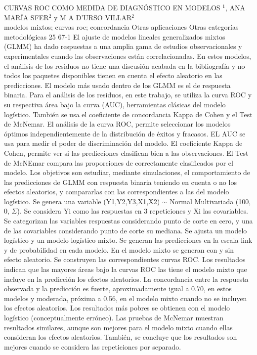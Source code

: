 \A
{CURVAS ROC COMO MEDIDA DE DIAGNÓSTICO EN MODELOS}
{$^1$, ANA MARÍA SFER$^2$ y M A D'URSO VILLAR$^2$}
{
\\}
{modelos mixtos; curvas roc; concordancia} 
 {Otras aplicaciones} 
 {Otras categorías metodológicas} 
 {25} 
 {67-1}
{El ajuste de modelos lineales generalizados mixtos (GLMM) ha dado respuestas a una amplia gama de estudios observacionales y experimentales cuando las observaciones están correlacionadas. En estos modelos, el análisis de los residuos no tiene una discusión acabada en la bibliografía y no todos los paquetes disponibles tienen en cuenta el efecto aleatorio en las predicciones. El modelo más usado dentro de los GLMM es el de respuesta binaria. Para el análisis de los residuos, en este trabajo, se utiliza la curva ROC y su respectiva área bajo la curva (AUC), herramientas clásicas del modelo logístico. También se usa el coeficiente de concordancia Kappa de Cohen y el Test de McNemar. El análisis de la curva ROC, permite seleccionar los modelos óptimos independientemente de la distribución de éxitos y fracasos. EL AUC se usa para medir el poder de discriminación del modelo. El coeficiente Kappa de Cohen, permite ver si las predicciones clasifican bien a las observaciones. El Test de McNEmar compara las proporciones de correctamente clasificados por el modelo. Los objetivos son estudiar, mediante simulaciones, el comportamiento de las predicciones de GLMM con respuesta binaria teniendo en cuenta o no los efectos aleatorios, y compararlas con las correspondientes a las del modelo logístico. Se genera una variable (Y1,Y2,Y3,X1,X2) $\sim$ Normal Multivariada (100, 0, $\Sigma$). Se considera Yi como las respuestas en 3 repeticiones y Xi las covariables. Se categorizan las variables respuestas considerando punto de corte en cero, y una de las covariables considerando punto de corte su mediana. Se ajusta un modelo logístico y un modelo logístico mixto. Se generan las predicciones en la escala link y de probabilidad en cada modelo. En el modelo mixto se generan con y sin efecto aleatorio. Se construyen las correspondientes curvas ROC. Los resultados indican que las mayores áreas bajo la curvas ROC las tiene el modelo mixto que incluye en la predicción los efectos aleatorios. La concordancia entre la respuesta observada y la predicción es fuerte, aproximadamente igual a 0.70, en estos modelos y moderada, próxima a 0.56, en el modelo mixto cuando no se incluyen los efectos aleatorios. Los resultados más pobres se obtienen con el modelo logístico (conceptualmente erróneo). Las pruebas de McNemar muestran resultados similares, aunque son mejores para el modelo mixto cuando ellas consideran los efectos aleatorios. También, se concluye que los resultados son mejores cuando se considera las repeticiones por separado.}
